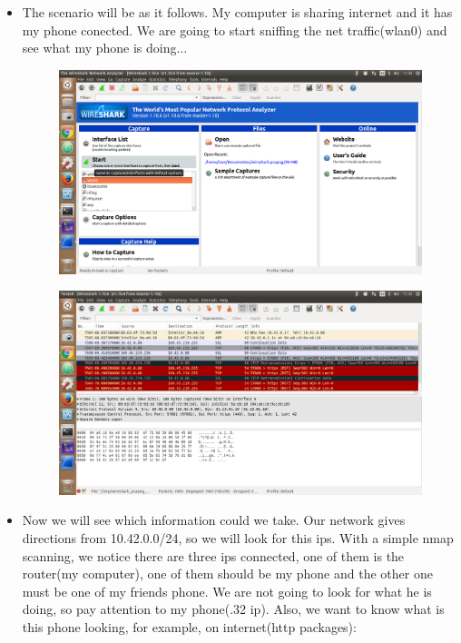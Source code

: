 	\begin{itemize}
 		\item The scenario will be as it follows. My computer is sharing internet and it has my phone conected. We are going to start sniffing the net traffic(wlan0) and see what my phone is doing...\\
 		
 		\begin{figure}[H]
			\centering
			\includegraphics[width=0.7\linewidth]{Wireshark_start_page}
			\caption[Wireshark Start page]{}
			\label{fig:Wireshark_start_page}
		\end{figure}
		
		\begin{figure}[H]
			\centering
			\includegraphics[width=0.7\linewidth]{Wireshark_Sniffing}
			\caption[Sniffed packages]{}
			\label{fig:Wireshark_Sniffing}
		\end{figure}

		\item Now we will see which information could we take. Our network gives directions from 10.42.0.0/24, so we will look for this ips. With a simple nmap scanning, we notice there are three ips connected, one of them is the router(my computer), one of them should be my phone and the other one must be one of my friends phone. We are not going to look for what he is doing, so pay attention to my phone(.32 ip). Also, we want to know what is this phone looking, for example, on internet(http packages):\\
		

\end{itemize}
